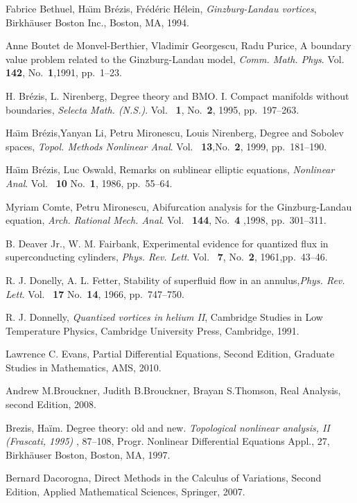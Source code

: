 \begin{thebibliography}{99}
Fabrice Bethuel, Ha\"ım Br\'ezis, Fr\'ed\'eric H\'elein, {\it Ginzburg-Landau vortices}, Birkh\"auser
Boston Inc., Boston, MA, 1994.


Anne Boutet de Monvel-Berthier, Vladimir Georgescu, Radu Purice, A boundary value
problem related to the Ginzburg-Landau model, {\it Comm. Math. Phys}. Vol.~ {\bf 142}, No.~{\bf 1},1991,
pp.~1–23.

H. Br\'ezis, L. Nirenberg, Degree theory and BMO. I. Compact manifolds without boundaries,
{\it Selecta Math. (N.S.)}. Vol.~ {\bf 1}, No.~{\bf 2}, 1995, pp.~197–263.


Ha\"ım Br\'ezis,Yanyan Li, Petru Mironescu, Louis Nirenberg, Degree and Sobolev spaces,
{\it Topol. Methods Nonlinear Anal}. Vol.~ {\bf 13},No.~{\bf 2}, 1999, pp.~181–190.

Ha\"ım Br\'ezis, Luc Oswald, Remarks on sublinear elliptic equations, {\it Nonlinear Anal}.
Vol.~ {\bf 10} No.~{\bf 1},  1986, pp.~55–64.

Myriam Comte, Petru Mironescu, Abifurcation analysis for the Ginzburg-Landau equation,
{\it Arch. Rational Mech. Anal}. Vol.~ {\bf 144}, No.~{\bf 4} ,1998, pp.~301–311.

B. Deaver Jr., W. M. Fairbank, Experimental evidence for quantized flux in superconducting
cylinders, {\it Phys. Rev. Lett}. Vol.~ {\bf 7}, No.~{\bf 2}, 1961,pp.~43–46.

R. J. Donelly, A. L. Fetter, Stability of superfluid flow in an annulus,{\it Phys. Rev. Lett}.
Vol.~ {\bf 17} No.~{\bf 14}, 1966, pp.~747–750.

R. J. Donnelly, {\it Quantized vortices in helium II}, Cambridge Studies in Low Temperature
Physics, Cambridge University Press, Cambridge, 1991.

 Lawrence C. Evans, Partial Differential Equations, Second Edition, Graduate Studies in Mathematics, 
AMS, 2010.

 Andrew M.Brouckner, Judith B.Brouckner, Brayan S.Thomson, Real Analysis, second Edition, 2008.

 Brezis, Haïm. Degree theory: old and new. {\it Topological nonlinear analysis, II (Frascati, 1995) }, 87--108, Progr. Nonlinear Differential Equations Appl., 27, Birkhäuser Boston, Boston, MA, 1997.

 Bernard Dacorogna, Direct Methods in the Calculus of Variations, Second Edition, Applied Mathematical Sciences, Springer, 2007.


\end{thebibliography}
